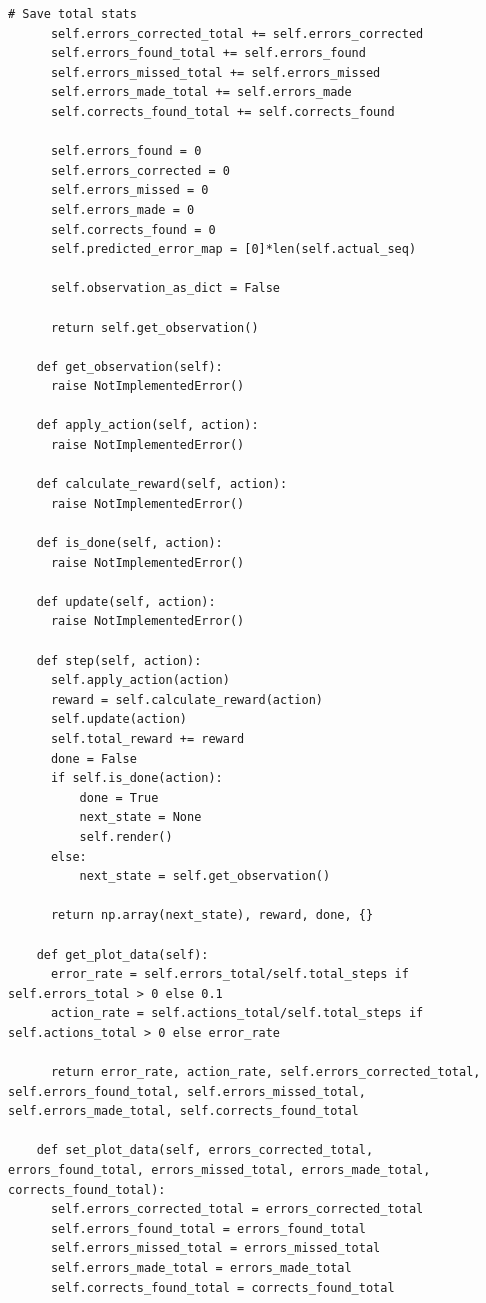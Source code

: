 \documentclass[oneside,bibliography=totocnumbered,BCOR=5mm]{scrbook}%
\theoremstyle{definition}
\theoremstyle{definition}
\theoremstyle{definition}
\theoremstyle{definition}
\theoremstyle{definition}
\theoremstyle{definition}
\begin{document}
\begin{appendix}
\begin{lstlisting}[caption={DNA-Environment Basisklasse}]
      # Save total stats
      self.errors_corrected_total += self.errors_corrected
      self.errors_found_total += self.errors_found
      self.errors_missed_total += self.errors_missed
      self.errors_made_total += self.errors_made
      self.corrects_found_total += self.corrects_found

      self.errors_found = 0
      self.errors_corrected = 0
      self.errors_missed = 0
      self.errors_made = 0
      self.corrects_found = 0
      self.predicted_error_map = [0]*len(self.actual_seq)

      self.observation_as_dict = False

      return self.get_observation()

    def get_observation(self):
      raise NotImplementedError()

    def apply_action(self, action):
      raise NotImplementedError()

    def calculate_reward(self, action):
      raise NotImplementedError()

    def is_done(self, action):
      raise NotImplementedError()

    def update(self, action):
      raise NotImplementedError()

    def step(self, action):
      self.apply_action(action)
      reward = self.calculate_reward(action)
      self.update(action)
      self.total_reward += reward
      done = False
      if self.is_done(action):
          done = True
          next_state = None
          self.render()
      else:
          next_state = self.get_observation()

      return np.array(next_state), reward, done, {}

    def get_plot_data(self):
      error_rate = self.errors_total/self.total_steps if self.errors_total > 0 else 0.1
      action_rate = self.actions_total/self.total_steps if self.actions_total > 0 else error_rate
      
      return error_rate, action_rate, self.errors_corrected_total, self.errors_found_total, self.errors_missed_total, self.errors_made_total, self.corrects_found_total

    def set_plot_data(self, errors_corrected_total, errors_found_total, errors_missed_total, errors_made_total, corrects_found_total):
      self.errors_corrected_total = errors_corrected_total
      self.errors_found_total = errors_found_total
      self.errors_missed_total = errors_missed_total
      self.errors_made_total = errors_made_total
      self.corrects_found_total = corrects_found_total


\end{lstlisting}
\end{appendix}
\end{document}

